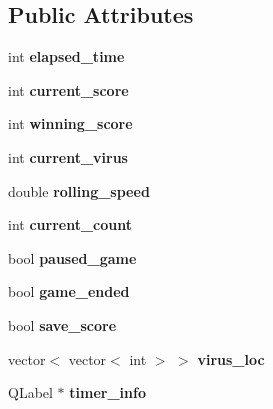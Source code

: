 \subsection*{Public Attributes}
\begin{DoxyCompactItemize}
\item 
\mbox{\label{classGame1Grid_af9bd5c08a0511489472cef0904bbe076}} 
int {\bfseries elapsed\+\_\+time}
\item 
\mbox{\label{classGame1Grid_af2031f545abc4c2453ae2c8e68cac2a4}} 
int {\bfseries current\+\_\+score}
\item 
\mbox{\label{classGame1Grid_adcd49fbafcb94b2a8d22c2aacc9dbee9}} 
int {\bfseries winning\+\_\+score}
\item 
\mbox{\label{classGame1Grid_a076381d9a4906c991d02f8cbf3e794ce}} 
int {\bfseries current\+\_\+virus}
\item 
\mbox{\label{classGame1Grid_a080f9f38136ab7a8ffb8919bb6586f25}} 
double {\bfseries rolling\+\_\+speed}
\item 
\mbox{\label{classGame1Grid_a6894b7fbdfdb34d4ca17c919bc11ed8c}} 
int {\bfseries current\+\_\+count}
\item 
\mbox{\label{classGame1Grid_a1fd5852433bb39f4d92a825be2bff9c8}} 
bool {\bfseries paused\+\_\+game}
\item 
\mbox{\label{classGame1Grid_a3bb5c92a6f79f809f2967a40d102589b}} 
bool {\bfseries game\+\_\+ended}
\item 
\mbox{\label{classGame1Grid_ac7b283dc13d9d826e39da1cccf8fc56f}} 
bool {\bfseries save\+\_\+score}
\item 
\mbox{\label{classGame1Grid_a0d63233ec6ad42e0b176a85a23707e47}} 
vector$<$ vector$<$ int $>$ $>$ {\bfseries virus\+\_\+loc}
\item 
\mbox{\label{classGame1Grid_aec374b3c5f5b37a6f9a23078058b8b3e}} 
Q\+Label $\ast$ {\bfseries timer\+\_\+info}
\item 

\end{DoxyCompactItemize}
